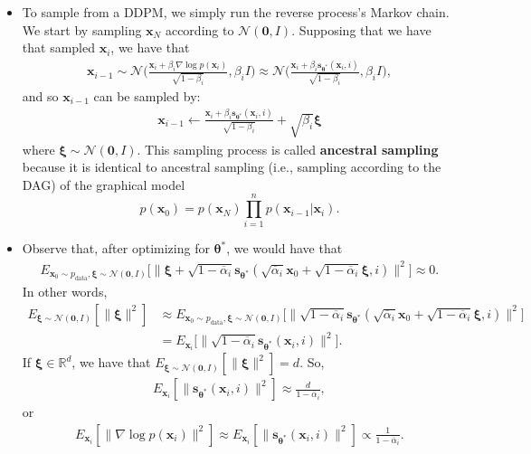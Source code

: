 \documentclass[10pt]{article}
\newcommand{\ve}[1]{\mathbf{#1}}
\newcommand{\mrm}[1]{\mathrm{#1}}
\newcommand{\ves}[1]{\boldsymbol{#1}}
\newcommand{\mcal}[1]{\mathcal{#1}}
\newcommand{\Real}{\mathbb{R}}
\begin{document}
\begin{itemize}
  \item To sample from a DDPM, we simply run the reverse process's Markov chain. We start by sampling $\ve{x}_N$ according to $\mcal{N}(\ve{0},I)$. Supposing that we have that sampled $\ve{x}_i$, we have that
  \begin{align*}
    \ve{x}_{i-1} \sim \mcal{N}\bigg( \frac{\ve{x}_i + \beta_i \nabla \log p(\ve{x}_i)}{\sqrt{1 - \beta_i}}, \beta_i I \bigg) \approx \mcal{N}\bigg( \frac{\ve{x}_i + \beta_i \ve{s}_{\ves{\theta}^*}(\ve{x}_i, i)}{\sqrt{1 - \beta_i}}, \beta_i I \bigg),
  \end{align*}  
  and so $\ve{x}_{i-1}$ can be sampled by:
  \begin{align*}
    \ve{x}_{i-1} \gets \frac{\ve{x}_i + \beta_i \ve{s}_{\ves{\theta}^*}(\ve{x}_i, i)}{\sqrt{1 - \beta_i}} + \sqrt{\beta_i}\ves{\xi}
  \end{align*}
  where $\ves{\xi} \sim \mcal{N}(\ve{0},I)$. This sampling process is called {\bf ancestral sampling} because it is identical to ancestral sampling (i.e., sampling according to the DAG) of the graphical model $$p(\ve{x}_0) = p(\ve{x}_N) \prod_{i=1}^n p(\ve{x}_{i-1}|\ve{x}_i).$$

  \item Observe that, after optimizing for $\ves{\theta}^*$, we would have that
  \begin{align*}
    E_{\ve{x}_0 \sim p_{\mrm{data}}, \ves{\xi} \sim \mcal{N}(\ve{0},I)} \big[ \big\| \ves{\xi} + \sqrt{1 - \overline{\alpha}_i} \ve{s}_{\ves{\theta}^*}(\sqrt{\overline{\alpha}_i} \ve{x}_0 + \sqrt{1 - \overline{\alpha}_i} \ves{\xi}, i) \big\|^2 \big]
    \approx 0.
  \end{align*}
  In other words,
  \begin{align*}
    E_{\ves{\xi} \sim \mcal{N}(\ve{0},I)} [\| \ves{\xi} \|^2 ]
    &\approx
    E_{\ve{x}_0 \sim p_{\mrm{data}}, \ves{\xi} \sim \mcal{N}(\ve{0},I)} \big[ \big\| \sqrt{1 - \overline{\alpha}_i} \ve{s}_{\ves{\theta}^*}(\sqrt{\overline{\alpha}_i} \ve{x}_0 + \sqrt{1 - \overline{\alpha}_i} \ves{\xi}, i) \big\|^2 \big] \\
    &= E_{\ve{x}_i} \big[ \big\| \sqrt{1 - \overline{\alpha}_i} \ve{s}_{\ves{\theta}^*}(\ve{x}_i, i) \big\|^2 \big].
  \end{align*}
  If $\ves{\xi} \in \Real^d$, we have that $E_{\ves{\xi} \sim \mcal{N}(\ve{0},I)} [\| \ves{\xi} \|^2 ] = d$. So,
  \begin{align*}
    E_{\ve{x}_i} [\| \ve{s}_{\ves{\theta}^*}(\ve{x}_i, i) \|^2 ] \approx \frac{d}{1 - \overline{\alpha}_i},
  \end{align*}
  or 
  \begin{align*}
    E_{\ve{x}_i} [\| \nabla \log p(\ve{x}_i) \|^2 ] \approx E_{\ve{x}_i} [\| \ve{s}_{\ves{\theta}^*}(\ve{x}_i, i) \|^2 ] \propto \frac{1}{1 - \overline{\alpha}_i}.
  \end{align*}
\end{itemize}
\end{document}

